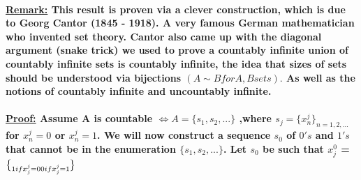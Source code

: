\documentclass[10pt,a4paper]{article}
\begin{document}
\paragraph{\underline{Remark:} This result is proven via a clever construction, which is due to Georg Cantor (1845 - 1918). A very famous German mathematician who invented set theory. Cantor also came up with the diagonal argument (snake trick) we used to prove a countably infinite union of countably infinite sets is countably infinite, the idea that sizes of sets should be understood via bijections $(A \sim B for A,B sets).$ As well as the notions of countably infinite and uncountably infinite.}

\paragraph{\underline{Proof:} Assume A is countable $\iff A = \lbrace s_{1},s_{2},...\rbrace$ ,where $s_{j} = \lbrace x_{n}^{j}\rbrace _{n = 1,2,...}$ for $x_{n}^{j} = 0$ or $x_{n}^{j} = 1$. We will now construct a sequence $s_{0}$ of $0's$ and $1's$ that cannot be in the enumeration $\lbrace s_{1},s_{2},...\rbrace$. Let $s_{0}$ be such that  $x_{j}^{0}$ = $\brace 1 if  x_{j}^{j} = 0 \newline 0 if  x_{j}^{j} = 1$
}
\end{document}

